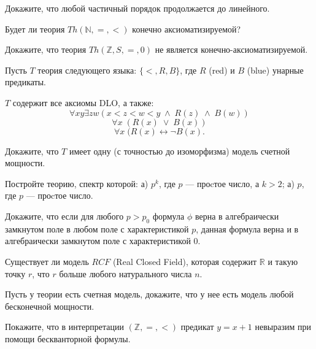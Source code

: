\begin{task}
    Докажите, что любой частичный порядок продолжается до линейного.
\end{task}

\begin{task}
    Будет ли теория $Th(\mathbb{N}, =, <)$ конечно аксиоматизируемой?
\end{task}

\begin{task}
    Докажите, что теория $Th(\mathbb{Z}, S, =, 0)$ не является
    конечно-аксиоматизируемой.
\end{task}

\begin{task}
    Пусть $T$ теория следующего языка: $\{<, R, B\}$, где $R$ (red) и $B$ (blue)
    унарные предикаты.
    
	$T$ содержит все аксиомы DLO, а также: 
	\[ \forall xy \exists zw (x < z < w < y \; \wedge \; R(z) \; \wedge \; B(w)) \]
	\[ \forall x \; (R(x)\; \vee \; B(x)) \]
	\[ \forall x \; (R(x) \leftrightarrow \neg B(x). \]
    
	Докажите, что $T$ имеет одну (с точностью до изоморфизма) модель счетной
    мощности.
\end{task}


\begin{task}
    Постройте теорию, спектр которой:
    а) $p^k$, где $p$ --- проcтое число, а $k > 2$;
    а) $p$, где $p$ --- проcтое число.
\end{task}

\begin{task}
    Докажите, что если для любого $p > p_0$ формула $\phi$ верна в алгебраически
    замкнутом поле в любом поле с характеристикой $p$, данная формула верна и в
    алгебраически замкнутом поле с характеристикой 0.
\end{task}

\begin{task}
  	Существует ли модель $RCF$ (Real Closed Field), которая содержит $\mathbb{R}$ и
    такую точку $r$, что $r$ больше любого натурального числа $n$.
\end{task}

\begin{task}
    Пусть у теории есть счетная модель, докажите, что у нее есть модель любой
    бесконечной мощности.
\end{task}

\begin{task}
    Покажите, что в интерпретации $(\mathbb{Z}, =, <)$ предикат $y = x
    + 1$ невыразим при помощи бескванторной формулы.
\end{task}